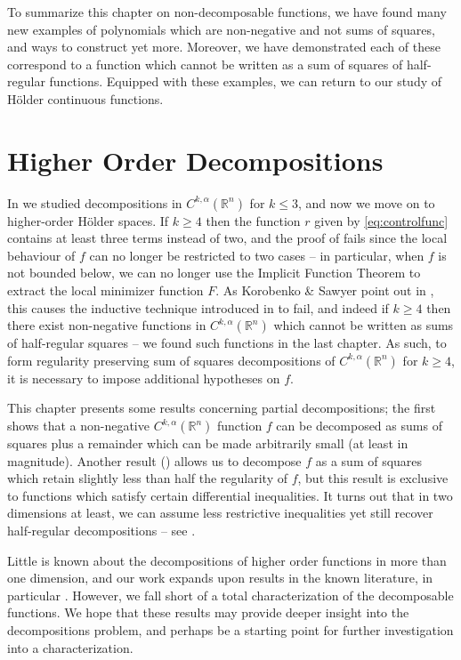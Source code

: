 \documentclass[oneside,hidelinks,indentfirst,10pt]{book}
\begin{document}
To summarize this chapter on non-decomposable functions, we have found many new examples of polynomials which are non-negative and not sums of squares, and ways to construct yet more. Moreover, we have demonstrated each of these correspond to a function which cannot be written as a sum of squares of half-regular functions. Equipped with these examples, we can return to our study of H\"older continuous functions.%
\chapter{Higher Order Decompositions}\label{chap:higher}


In  we studied decompositions in \(C^{k,\alpha}(\mathbb{R}^n)\) for \(k\leq3\), and now we move on to higher-order H\"older spaces. If \(k\geq 4\) then the function \(r\) given by \eqref{eq:controlfunc} contains at least three terms instead of two, and the proof of  fails since the local behaviour of \(f\) can no longer be restricted to two cases -- in particular, when \(f\) is not bounded below, we can no longer use the Implicit Function Theorem to extract the local minimizer function \(F\). As Korobenko \& Sawyer point out in \cite{SOS_I}, this causes the inductive technique introduced in \cite{Fefferman-Phong} to fail, and indeed if \(k\geq 4\) then there exist non-negative functions in \(C^{k,\alpha}(\mathbb{R}^n)\) which cannot be written as sums of half-regular squares -- we found such functions in the last chapter. As such, to form regularity preserving sum of squares decompositions of \(C^{k,\alpha}(\mathbb{R}^n)\) for \(k\geq 4\), it is necessary to impose additional hypotheses on \(f\). 


This chapter presents some results concerning partial decompositions; the first shows that a non-negative \(C^{k,\alpha}(\mathbb{R}^n)\) function \(f\) can be decomposed as sums of squares plus a remainder which can be made arbitrarily small (at least in magnitude). Another result () allows us to decompose \(f\) as a sum of squares which retain slightly less than half the regularity of \(f\), but this result is exclusive to functions which satisfy certain differential inequalities. It turns out that in two dimensions at least, we can assume less restrictive inequalities yet still recover half-regular decompositions -- see .


Little is known about the decompositions of higher order functions in more than one dimension, and our work expands upon results in the known literature, in particular \cite{SOS_I}. However, we fall short of a total characterization of the decomposable functions. We hope that these results may provide deeper insight into the decompositions problem, and perhaps be a starting point for further investigation into a characterization.
\end{document}
